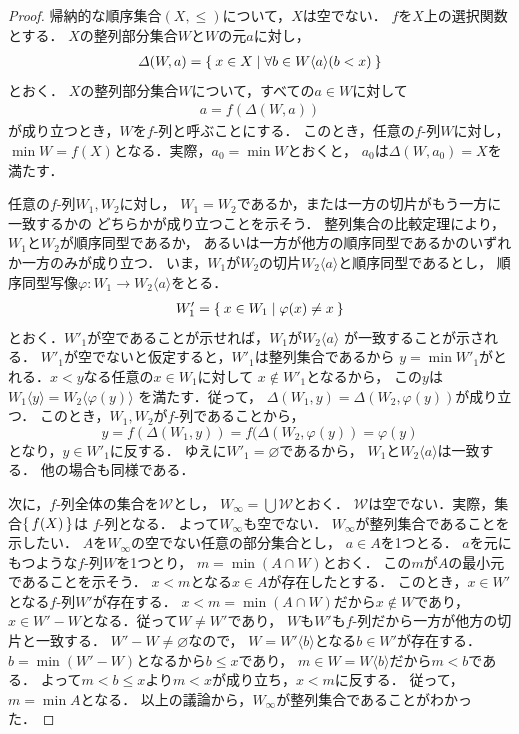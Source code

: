   \begin{proof}
    帰納的な順序集合$(X, {\leq} )$について，$X$は空でない．
    $f$を$X$上の選択関数とする．
    $X$の整列部分集合$W$と$W$の元$a$に対し，
    \begin{align*}
      \varDelta ( W,a) = \Set{ x \in X \mid \forall b \in W 
      \langle a \rangle ( b<x )}
    \end{align*}
    とおく．
    $X$の整列部分集合$W$について，すべての$a \in W$に対して
    \begin{align*}
      a= f( \varDelta ( W, a) )
    \end{align*}
    が成り立つとき，$W$を$f$-列と呼ぶことにする．
    このとき，任意の$f$-列$W$に対し，
    $\min W = f(X)$となる．実際，$a_0= \min W$とおくと，
    $a_0$は$\varDelta ( W,a_0) = X$を満たす．

    任意の$f$-列$W_1, W_2$に対し，
    $W_1=W_2$であるか，または一方の切片がもう一方に一致するかの
    どちらかが成り立つことを示そう．
    整列集合の比較定理により，$W_1$と$W_2$が順序同型であるか，
    あるいは一方が他方の順序同型であるかのいずれか一方のみが成り立つ．
    いま，$W_1$が$W_2$の切片$W_2 \langle a \rangle$と順序同型であるとし，
    順序同型写像$\varphi : W_1 \longrightarrow W_2 \langle a \rangle$をとる．
    \begin{align*}
      W'_1 = \Set{ x \in W_1 \mid \varphi (x) \neq x }
    \end{align*}
    とおく．$W'_1$が空であることが示せれば，$W_1$が$W_2 \langle a \rangle$
    が一致することが示される．
    $W'_1$が空でないと仮定すると，$W'_1$は整列集合であるから
    $y = \min W'_1$がとれる．$x < y$なる任意の$x \in W_1$に対して
    $x \notin W'_1$となるから，
    この$y$は$W_1 \langle y \rangle = W_2 \langle \varphi (y) \rangle$
    を満たす．従って，
    $\varDelta ( W_1, y ) = \varDelta ( W_2 , \varphi (y) )$が成り立つ．
    このとき，$W_1, W_2$が$f$-列であることから，
    \[
      y= f( \varDelta ( W_1 , y ))= f( \varDelta ( W_2 , \varphi (y) ) = \varphi (y)
    \]
    となり，$y \in W'_1$に反する．
    ゆえに$W'_1 = \varnothing$であるから，
    $W_1$と$W_2 \langle a \rangle$は一致する．
    他の場合も同様である．

    次に，$f$-列全体の集合を$\mathscr{W}$とし，
    $W_{\infty} = \bigcup \mathscr{W}$とおく．
    $\mathscr{W}$は空でない．実際，集合$\set{ f(X) }$は
    $f$-列となる．
    よって$W_{\infty}$も空でない．
    $W_{\infty}$が整列集合であることを示したい．
    $A$を$W_{\infty}$の空でない任意の部分集合とし，
    $a \in A$を1つとる．
    $a$を元にもつような$f$-列$W$を1つとり，
    $m = \min ( A \cap W)$とおく．
    この$m$が$A$の最小元であることを示そう．
    $x< m$となる$x \in A$が存在したとする．
    このとき，$x \in W'$となる$f$-列$W'$が存在する．
    $x<m= \min (A \cap W)$だから$x \notin W$であり，
    $x \in W' -W$となる．従って$W \neq W'$であり，
    $W$も$W'$も$f$-列だから一方が他方の切片と一致する．
    $W' -W \neq \varnothing$なので，
    $W = W' \langle b \rangle$となる$b \in W'$が存在する．
    $b= \min ( W' -W)$となるから$b \leq x$であり，
    $m \in W = W \langle b \rangle$だから$m < b$である．
    よって$m < b \leq x$より$m<x$が成り立ち，$x < m$に反する．
    従って，$m = \min A$となる．
    以上の議論から，$W_{\infty}$が整列集合であることがわかった．


\end{proof}
